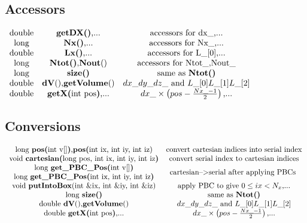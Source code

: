 \documentclass[aps,preprint]{revtex4-1}%
\begin{document}
\subsection{Accessors}

$%
\begin{array}
[c]{ccc}%
\text{double} & \text{\textbf{getDX()},...} & \text{accessors for dx\_,...}\\
\text{long} & \text{\textbf{Nx()},...} & \text{accessors for Nx\_,...}\\
\text{double} & \text{\textbf{Lx()},...} & \text{accessors for L\_[0],...}\\
\text{long} & \text{\textbf{Ntot()},\textbf{Nout}()} & \text{accessors for
Ntot\_,Nout\_}\\
\text{long} & \text{\textbf{size()}} & \text{same as \textbf{Ntot()}}\\
\text{double} & \text{\textbf{dV}(),\textbf{getVolume}()} & dx\_dy\_dz\_\text{
and }L\_[0]L\_[1]L\_[2]\\
\text{double} & \text{\textbf{getX(}int pos\textbf{)},...} & dx\_\times\left(
pos-\frac{Nx\_-1}{2}\right)  \text{,...}%
\end{array}
$

\subsection{Conversions}

$%
\begin{array}
[c]{cc}%
\text{long \textbf{pos(}int v[]\textbf{)},\textbf{pos(}int ix, int iy, int
iz)} & \text{convert cartesian indices into serial index}\\
\text{void \textbf{cartesian(}long pos, int ix, int iy, int iz\textbf{)}} &
\text{convert serial index to cartesian indices}\\%
\begin{array}
[c]{c}%
\text{long \textbf{get\_PBC\_Pos(}int v[]\textbf{)}}\\
\text{long \textbf{get\_PBC\_Pos(}int ix, int iy, int iz\textbf{)}}%
\end{array}
& \text{cartesian--%
$>$%
serial after applying PBCs }\\
\text{void \textbf{putIntoBox}(int \&ix, int \&iy, int\ \&iz)} & \text{apply
PBC to give }0\leq ix<N_{x}\text{,...}\\
\text{long \textbf{size()}} & \text{same as \textbf{Ntot()}}\\
\text{double \textbf{dV}(),\textbf{getVolume}()} & dx\_dy\_dz\_\text{ and
}L\_[0]L\_[1]L\_[2]\\
\text{double \textbf{getX(}int pos\textbf{)},...} & dx\_\times\left(
pos-\frac{Nx\_-1}{2}\right)  \text{,...}%
\end{array}
$
\end{document}
